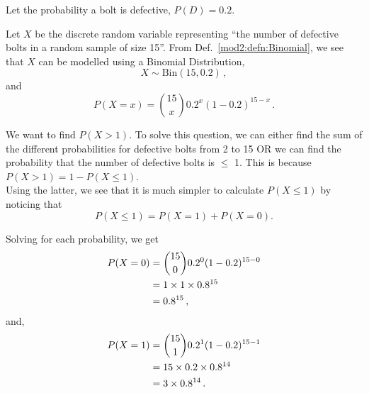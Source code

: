 %
%
%

\begin{subquestions}
	
\subquestion

Let the probability a bolt is defective, $P(D)= 0.2$. 

\begin{subsubquestions}
	
   \subsubquestion	

   Let $X$ be the discrete random variable representing ``the number of defective bolts in a random sample of size 15''. From Def.~\ref{mod2:defn:Binomial}, we see that $X$ can be modelled using a Binomial Distribution,
   \begin{equation}
   	 X \sim \text{Bin}(15,0.2) \,,
   \end{equation}
   and
   \begin{equation}
   	P(X = x) = { 15 \choose x} 0.2^x (1-0.2)^{15-x} \,. 
   \end{equation}

   We want to find $P(X>1)$. To solve this question, we can either find the sum of the different probabilities for defective bolts from 2 to 15 OR we can find the probability that the number of defective bolts is $\leq$ 1. This is because $P(X>1)=1-P(X\leq1)$.  \\

   Using the latter, we see that it is much simpler to calculate $P(X\leq1) $   by noticing that 
   \begin{equation}
   	P(X \leq 1)  =  P(X=1)+P(X=0). 
   \end{equation}

   Solving for each probability, we get
   \begin{align}
   	P(X=0)&={ 15 \choose 0} 0.2^0 (1-0.2)^{15-0} \nonumber \\
   	&=1\times1\times0.8^{15} \nonumber \\
   	&=0.8^{15}\,,
   \end{align}
   and,
   \begin{align}
   	P(X=1)&={ 15 \choose 1} 0.2^1 (1-0.2)^{15-1} \nonumber \\
   	&=15 \times 0.2 \times 0.8^{14} \nonumber \\
   	&=3\times 0.8^{14} \,. 
   \end{align}


\end{subsubquestions}
\end{subquestions}
